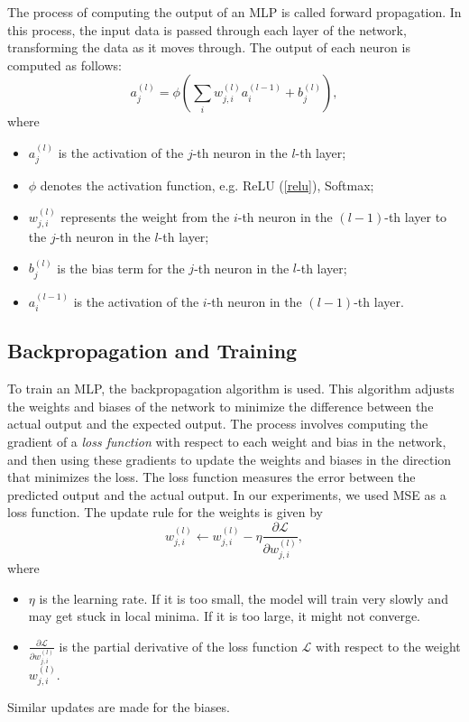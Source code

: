The process of computing the output of an MLP is called forward propagation.
In this process, the input data is passed through each layer of the network, transforming the data as it moves through. The output of each neuron is computed as follows:
\begin{equation}
	a^{(l)}_j = \phi\left(\sum_{i} w^{(l)}_{j,i} a^{(l-1)}_i + b^{(l)}_j\right),
\end{equation}
where
\begin{itemize}
	\item $a^{(l)}_j$ is the activation of the $j$-th neuron in the $l$-th layer;
	\item $\phi$ denotes the activation function, e.g. ReLU (\autoref{relu}), Softmax;
	\item $w^{(l)}_{j,i}$ represents the weight from the $i$-th neuron in the $(l-1)$-th layer to the $j$-th neuron in the $l$-th layer;
	\item $b^{(l)}_j$ is the bias term for the $j$-th neuron in the $l$-th layer;
	\item $a^{(l-1)}_i$ is the activation of the $i$-th neuron in the $(l-1)$-th layer.
\end{itemize}

\subsection{Backpropagation and Training}

To train an MLP, the backpropagation algorithm is used.
This algorithm adjusts the weights and biases of the network to minimize the difference between the actual output and the expected output.
The process involves computing the gradient of a \emph{loss function} with respect to each weight and bias in the network, and then using these gradients to update the weights and biases in the direction that minimizes the loss.
The loss function measures the error between the predicted output and the actual output. In our experiments, we used MSE as a loss function. The update rule for the weights is given by
\begin{equation}
	w^{(l)}_{j,i} \leftarrow w^{(l)}_{j,i} - \eta \frac{\partial \mathcal{L}}{\partial w^{(l)}_{j,i}},
\end{equation}
where
\begin{itemize}
	\item $\eta$ is the learning rate. If it is too small, the model will train very slowly and may get stuck in local minima. If it is too large, it might not converge.
	\item $\frac{\partial \mathcal{L}}{\partial w^{(l)}_{j,i}}$ is the partial derivative of the loss function $\mathcal{L}$ with respect to the weight $w^{(l)}_{j,i}$.
\end{itemize}
Similar updates are made for the biases.

